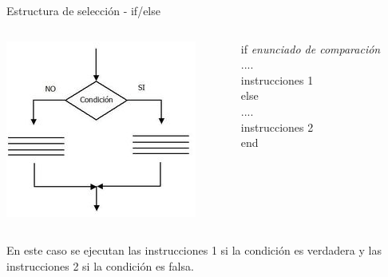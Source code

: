 \documentclass{bredelebeamer}
\begin{document}
\begin{frame}{Estructura de selección - if/else}
\begin{columns}
\begin{column}{0.5\textwidth}
\begin{center}
\includegraphics[scale=0.5]{images/pantalla4.png}
\end{center}
\end{column}
\begin{column}{0.3\textwidth}
if \textit{enunciado de comparación}\\
	....\\
    instrucciones 1\\
else\\
 	....\\
    instrucciones 2\\
end
\end{column}
\end{columns}
\begin{center}
En este caso se ejecutan las instrucciones 1 si la condición es verdadera y las instrucciones 2 si la condición es falsa. 
\end{center}
\end{frame}
\end{document}
